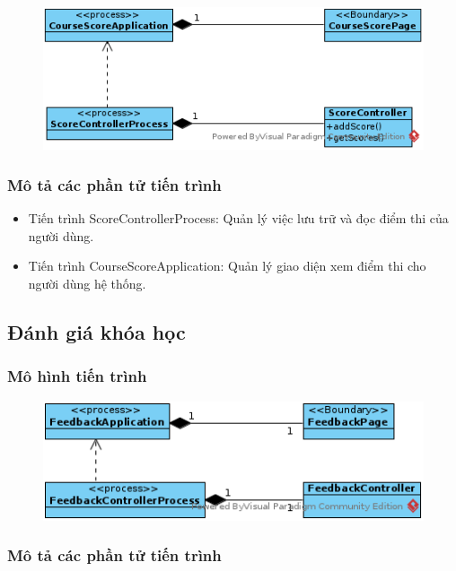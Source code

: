 \documentclass[./../main_file.tex]{subfiles}
\begin{document}
\begin{figure}[H]
	\centering
	\includegraphics[width=\linewidth]{./images/pv_check_course_progress.png}
\end{figure}

\subsubsection{Mô tả các phần tử tiến trình}

\begin{itemize}
	\item Tiến trình ScoreControllerProcess: Quản lý việc lưu trữ và đọc điểm thi của người dùng.
	\item Tiến trình CourseScoreApplication: Quản lý giao diện xem điểm thi cho người dùng hệ thống.
\end{itemize}

\subsection{Đánh giá khóa học}

\subsubsection{Mô hình tiến trình}

\begin{figure}[H]
	\centering
	\includegraphics[width=\linewidth]{./images/pv_feedback_course.png}
\end{figure}

\subsubsection{Mô tả các phần tử tiến trình}
\end{document}
